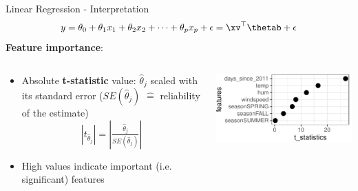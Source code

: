 \documentclass[11pt,compress,t,notes=noshow, aspectratio=169, xcolor=table]{beamer}
\begin{document}
     
\begin{frame}{Linear Regression - Interpretation}
\vspace{-0.2cm}
$$y = \theta_0 + \theta_1 x_1 + \theta_2 x_2 + \dots + \theta_p x_p + \epsilon = \xv^\top \thetab + \epsilon$$
    \textbf{Feature importance}:
    \begin{columns}[T, totalwidth=\linewidth]
    \begin{column}{0.6\textwidth}
    \begin{itemize}
        \item Absolute \textbf{t-statistic} value: $\hat\theta_j$ scaled with its standard error ($SE(\hat\theta_j)$ $\hat =$ reliability of the estimate) 
    $$|t_{\hat\theta_j}| = \left| \tfrac{\hat\theta_j}{SE(\hat\theta_j)} \right|$$
        \item High values indicate important (i.e. significant) features
    \end{itemize}
    \end{column}
    \begin{column}{0.4\textwidth}
    \vspace{-0.2cm}
    \begin{center}
        \includegraphics[width=.9\textwidth]{figure/t_stat.pdf} 
    \end{center}
    \end{column}
    \end{columns}
    \vspace{0.3cm}
\end{frame}
\end{document}
